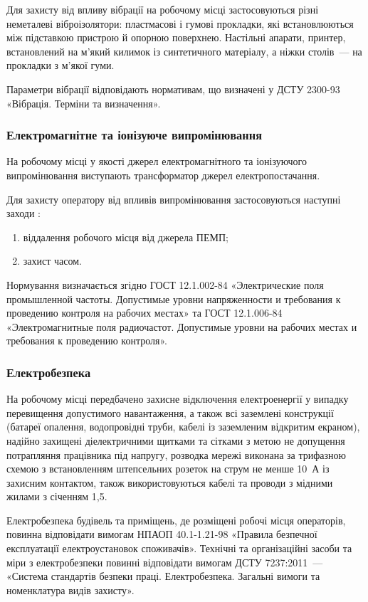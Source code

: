 \documentclass[a4paper,ukrainian,utf8,nocolumnsxix,floatsection,equationsection]{eskdtext}
\renewcommand\paragraph{\subsubsection}
\begin{document}
Для захисту від впливу вібрації  на робочому місці застосовуються різні неметалеві віброізолятори: пластмасові і гумові прокладки, які встановлюються між підставкою пристрою й опорною поверхнею. Настільні апарати, принтер, встановлений на м'який килимок із синтетичного матеріалу, а ніжки столів~--- на прокладки з м'якої гуми.

Параметри вібрації відповідають нормативам, що визначені у ДСТУ 2300-93 «Вібрація. Терміни та визначення».

\paragraph{Електромагнітне та іонізуюче випромінювання}

На робочому місці у якості джерел електромагнітного та іонізуючого випромінювання виступають трансформатор джерел електропостачання.


Для захисту оператору від впливів випромінювання застосовуються наступні заходи \cite{work:safety:17}:

\begin{enumerate}
	\item віддалення робочого місця від джерела ПЕМП;
	\item захист часом.
\end{enumerate}

Нормування визначається згідно ГОСТ 12.1.002-84 «Электрические поля промышленной частоты. Допустимые уровни напряженности и требования к проведению контроля на рабочих местах» та ГОСТ 12.1.006-84 «Электромагнитные поля радиочастот. Допустимые уровни на рабочих местах и требования к проведению контроля».

\paragraph{Електробезпека}

На робочому місці передбачено захисне відключення електроенергії у випадку перевищення допустимого навантаження, а також всі заземлені конструкції (батареї опалення,  водопровідні труби, кабелі із заземленим відкритим екраном), надійно захищені діелектричними щитками та сітками з метою не допущення потрапляння працівника під напругу, розводка мережі виконана за трифазною схемою з встановленням штепсельних розеток на струм не менше 10~А із захисним контактом, також використовуються кабелі та проводи з мідними жилами з січенням 1,5.

Електробезпека будівель та приміщень, де розміщені робочі місця операторів, повинна відповідати вимогам НПАОП 40.1-1.21-98 «Правила безпечної експлуатації електроустановок споживачів». Технічні та організаційні засоби та міри з електробезпеки повинні відповідати вимогам ДСТУ 7237:2011~--- «Система стандартів безпеки праці. Електробезпека. Загальні вимоги та номенклатура видів захисту».
\end{document}
